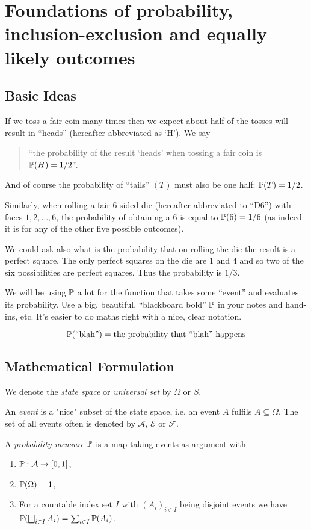 \section{Foundations of probability, inclusion-exclusion and equally likely outcomes}

\subsection{Basic Ideas}
If we toss a fair coin many times then we expect about half of the tosses will result in ``heads'' (hereafter abbreviated as `H'). We say
\begin{quotation}
   ``the probability of the result `heads' when tossing a fair coin is ${\mathbb P}(H) = 1/2$''. 
\end{quotation}
And of course the probability of ``tails'' $(T)$ must also be one half: ${\mathbb P}(T)=1/2$.

Similarly, when rolling a fair $6$-sided die (hereafter abbreviated to ``D6'') with faces $1,2,\dots,6$, the probability of obtaining a $6$ is equal to ${\mathbb P} (6) = 1/6$ (as indeed it is for any of the other five possible outcomes).

We could ask also what is the probability that on rolling the die the result is a perfect square.  The only perfect squares on the die are $1$ and $4$ and so two of the six possibilities are perfect squares. Thus the probability is $1/3$.

\tcb
We will be using ${\mathbb P}$ a lot for the function that takes some ``event'' and evaluates its probability. Use a big, beautiful, ``blackboard bold'' ${\mathbb P}$ in your notes and hand-ins, etc. It's easier to do maths right with a nice, clear notation. 

\vspace*{-5.5ex}
{\LARGE \[ {\mathbb P}( \text{``blah''}) = \text{the probability that ``blah'' happens} \] } 
\etcb

\subsection{Mathematical Formulation}
\begin{defn}
We denote the \emph{state space} or \emph{universal set} by $\Omega$ or $S$. 
\end{defn}
\begin{defn}
An \emph{event} is a "nice" subset of the state space, i.e. an event $A$ fulfils $A \subseteq \Omega$.
The set of all events often is denoted by $\mathcal{A}$, $\mathcal{E}$ or $\mathcal{F}$.
\end{defn}
\begin{defn}
A \emph{probability measure} ${\mathbb P}$ is a map taking events as argument with
\begin{enumerate}
\item ${\mathbb P}: \mathcal{A} \to [0,1]$,
\item ${\mathbb P}(\Omega)=1$,
\item For a countable index set $I$ with $(A_i)_{i \in I}$ being disjoint events we have ${\mathbb P}( \bigsqcup_{i \in I} A_i) = \sum_{i\in I} {\mathbb P}(A_i)$.
\end{enumerate}
\end{defn}
